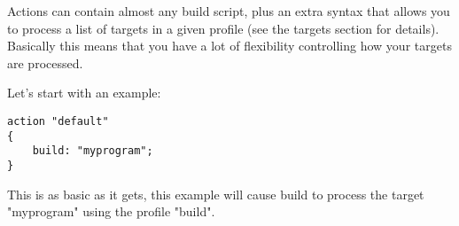 \documentclass[letterpaper]{book}
\begin{document}
Actions can contain almost any build script, plus an extra syntax that allows
you to process a list of targets in a given profile (see the targets section
for details). Basically this means that you have a lot of flexibility
controlling how your targets are processed.

Let's start with an example:

\begin{lstlisting}
action "default"
{
    build: "myprogram";
}
\end{lstlisting}

This is as basic as it gets, this example will cause build to process the
target "myprogram" using the profile "build".
\end{document}
